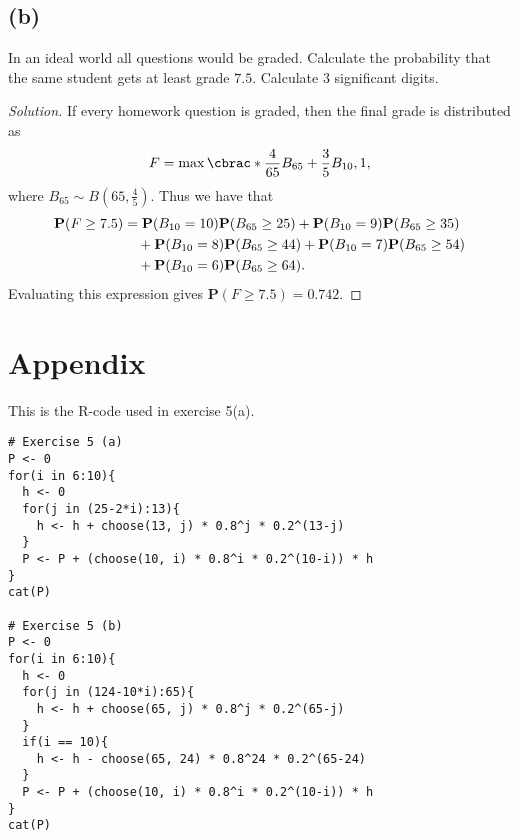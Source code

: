 \documentclass[10pt, a4paper, twoside]{amsart}
\DeclarePairedDelimiter\cbrac\{\}
\renewcommand{\P}{\ensuremath{\mathbf{P}}}
\newenvironment{solution}
               {\let\oldqedsymbol=\qedsymbol
                \renewcommand{\qedsymbol}{$\blacktriangleleft$}
                \begin{proof}[Solution]}
               {\end{proof}
                \renewcommand{\qedsymbol}{\oldqedsymbol}}
\begin{document}
\subsection*{(b)}
In an ideal world all questions would be graded. Calculate the probability 
that the same student gets at least grade $7.5$. Calculate $3$
significant digits.
\begin{solution}
 

If every homework question is graded, then the final grade is distributed as
\begin{equation*}
F=\max\cbrac*{\frac{4}{65}B_{65}+\frac{3}{5}B_{10},1}, 
\end{equation*}
where $B_{65}\sim B(65, \tfrac{4}{5})$.
Thus we have that 
\begin{equation}\label{eq:prob_b}
\begin{aligned}
  \P(F \geq 7.5)&=\P(B_{10} = 10)\P(B_{65} \geq 25)+\P(B_{10} = 9)\P(B_{65} \geq 35) \\
 & \hspace{1 em} +\P(B_{10} = 8)\P(B_{65} \geq 44)+\P(B_{10} = 7)\P(B_{65} \geq 54) \\
 & \hspace{1 em} +\P(B_{10} = 6)\P(B_{65} \geq 64).
 \end{aligned}
\end{equation}
Evaluating this expression gives $\P(F \geq 7.5)=0.742$.
\end{solution}


\section*{Appendix}
This is the R-code used in exercise 5(a).
\begin{verbatim}
# Exercise 5 (a)
P <- 0
for(i in 6:10){
  h <- 0
  for(j in (25-2*i):13){
    h <- h + choose(13, j) * 0.8^j * 0.2^(13-j)
  }
  P <- P + (choose(10, i) * 0.8^i * 0.2^(10-i)) * h
}
cat(P)

# Exercise 5 (b)
P <- 0
for(i in 6:10){
  h <- 0
  for(j in (124-10*i):65){
    h <- h + choose(65, j) * 0.8^j * 0.2^(65-j)
  }
  if(i == 10){
    h <- h - choose(65, 24) * 0.8^24 * 0.2^(65-24)
  }
  P <- P + (choose(10, i) * 0.8^i * 0.2^(10-i)) * h
}
cat(P)
\end{verbatim}


 
\end{document}
